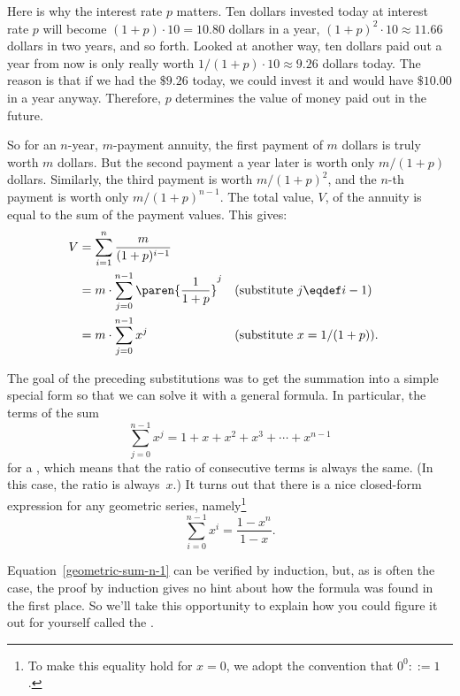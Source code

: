Here is why the interest rate $p$ matters.  Ten dollars invested today
at interest rate $p$ will become $(1+p)\cdot 10 = 10.80$ dollars in a
year, $(1+p)^2\cdot 10 \approx 11.66$ dollars in two years, and so
forth.  Looked at another way, ten dollars paid out a year from now is
only really worth $1/(1+p) \cdot 10 \approx 9.26$ dollars today.  The
reason is that if we had the $\$9.26$ today, we could invest it and
would have $\$10.00$ in a year anyway.  Therefore, $p$ determines the
value of money paid out in the future.

So for an $n$-year, $m$-payment annuity, the first payment of $m$ dollars
is truly worth $m$ dollars.  But the second payment a year later is worth
only $m/(1+p)$ dollars.  Similarly, the third payment is worth
$m/(1+p)^2$, and the $n$-th payment is worth only $m/(1+p)^{n-1}$.  The
total value, $V$, of the annuity is equal to the sum of the payment
values.  This gives:
\begin{align}
  V & = \sum_{i=1}^n \frac{m}{(1+p)^{i-1}}\notag\\
  & = m \cdot \sum_{j=0}^{n-1} \paren{\frac{1}{1+p}}^j
          && \text{(substitute $j \eqdef i-1$)}\notag\\
  & = m \cdot \sum_{j=0}^{n-1} x^j
          && \text{(substitute $x = 1/(1+p)$)}.\label{jn-1xsum}
\end{align}

The goal of the preceding substitutions was to get the summation into
a simple special form so that we can solve it with a general formula.
In particular, the terms of the sum
\begin{equation*}
    \sum_{j = 0}^{n - 1} x^j = 1 + x + x^2 + x^3 + \cdots + x^{n - 1}
\end{equation*}
for a , which means that the ratio of
consecutive terms is always the same.  (In this case, the ratio is
always~$x$.)  It turns out that there is a nice closed-form expression
for any geometric series, namely\footnote{To make this equality hold
  for $x = 0$, we adopt the convention that $0^0 ::= 1$.}  
\begin{equation}\label{geometric-sum-n-1}
    \sum_{i = 0}^{n - 1} x^i = \frac{1 - x^n}{1 - x}.
\end{equation}

Equation~\eqref{geometric-sum-n-1} can be verified by induction, but,
as is often the case, the proof by induction gives no hint about how
the formula was found in the first place.  So we'll take this
opportunity to explain how you could figure it out for yourself called
the .

